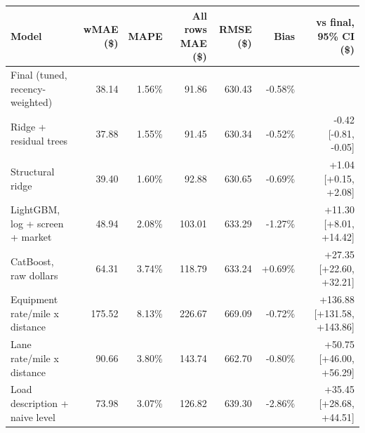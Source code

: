 \begin{tabular}{lrrrrrr}
\toprule
Model & wMAE (\$) & MAPE & All rows MAE (\$) & RMSE (\$) & Bias & vs final, 95\% CI (\$) \\
\midrule
Final (tuned, recency-weighted) & 38.14 & 1.56\% & 91.86 & 630.43 & -0.58\% &  \\
Ridge + residual trees & 37.88 & 1.55\% & 91.45 & 630.34 & -0.52\% & -0.42 [-0.81, -0.05] \\
Structural ridge & 39.40 & 1.60\% & 92.88 & 630.65 & -0.69\% & +1.04 [+0.15, +2.08] \\
LightGBM, log + screen + market & 48.94 & 2.08\% & 103.01 & 633.29 & -1.27\% & +11.30 [+8.01, +14.42] \\
CatBoost, raw dollars & 64.31 & 3.74\% & 118.79 & 633.24 & +0.69\% & +27.35 [+22.60, +32.21] \\
Equipment rate/mile x distance & 175.52 & 8.13\% & 226.67 & 669.09 & -0.72\% & +136.88 [+131.58, +143.86] \\
Lane rate/mile x distance & 90.66 & 3.80\% & 143.74 & 662.70 & -0.80\% & +50.75 [+46.00, +56.29] \\
Load description + naive level & 73.98 & 3.07\% & 126.82 & 639.30 & -2.86\% & +35.45 [+28.68, +44.51] \\
\bottomrule
\end{tabular}
